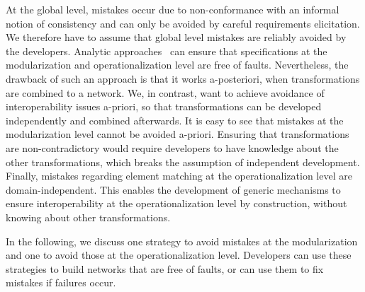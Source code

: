 At the global level, mistakes occur due to non-conformance with an informal notion of consistency and %
can only be avoided by careful requirements elicitation. 
We therefore have to assume that global level mistakes are reliably avoided by the developers.
Analytic approaches~\cite{klare2018docsym}
can ensure that specifications at the modularization and operationalization level are free of faults.
Nevertheless, %
the drawback of such an approach is that it works a-posteriori, when transformations are combined to a network. %
We, in contrast, want to achieve avoidance of interoperability issues a-priori, so that transformations can be developed independently and combined afterwards.
It is easy to see that mistakes at the modularization level cannot be avoided a-priori. 
Ensuring that transformations are non-contradictory %
would require developers to have knowledge about the other transformations, which breaks the assumption of independent development.
%
Finally, mistakes regarding element matching at the operationalization level are domain-independent. 
This enables the development of generic mechanisms to ensure interoperability at the operationalization level by construction, without knowing about other transformations.

In the following, we discuss one strategy to avoid mistakes at the modularization and one to avoid those at the operationalization level.
Developers can use these strategies to build networks that are free of faults, or can use them to fix mistakes if failures occur.


